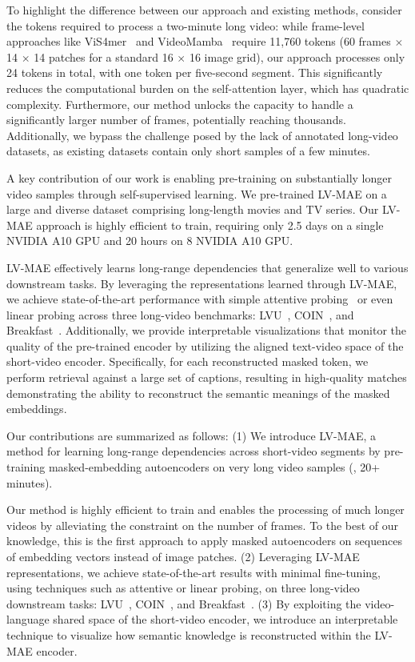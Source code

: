 To highlight the difference between our approach and existing methods, consider the tokens required to process a two-minute long video: while frame-level approaches like ViS4mer~\cite{islam2022long} and VideoMamba~\cite{li2024videomamba} require 11,760 tokens (60 frames $\times$ 14 $\times$ 14 patches for a standard 16 $\times$ 16 image grid), our approach processes only 24 tokens in total, with one token per five-second segment.
This significantly reduces the computational burden on the self-attention layer, which has quadratic complexity. 
Furthermore, our method unlocks the capacity to handle a significantly larger number of frames, potentially reaching thousands. Additionally, we bypass the challenge posed by the lack of annotated long-video datasets, as existing datasets contain only short samples of a few minutes. 

A key contribution of our work is enabling pre-training on substantially longer video samples through self-supervised learning. We pre-trained LV-MAE on a large and diverse dataset comprising long-length movies and TV series. Our LV-MAE approach is highly efficient to train, requiring only 2.5 days on a single NVIDIA A10 GPU and 20 hours on 8 NVIDIA A10 GPU.


LV-MAE effectively learns long-range dependencies that generalize well to various downstream tasks. By leveraging the representations learned through LV-MAE, we achieve state-of-the-art performance with simple attentive probing~\cite{yu2022coca} or even linear probing across three long-video benchmarks: LVU~\cite{wu2021towards}, COIN~\cite{tang2019coin}, and Breakfast~\cite{kuehne2014language}. Additionally, we provide interpretable visualizations that monitor the quality of the pre-trained encoder by utilizing the aligned text-video space of the short-video encoder. Specifically, for each reconstructed masked token, we perform retrieval against a large set of captions, resulting in high-quality matches demonstrating the ability to reconstruct the semantic meanings of the masked embeddings. 

Our contributions are summarized as follows: (1) We introduce LV-MAE, a method for learning long-range dependencies across short-video segments by pre-training masked-embedding autoencoders on very long video samples (\eg, 20+ minutes). 

Our method is highly efficient to train and enables the processing of much longer videos by alleviating the constraint on the number of frames.
To the best of our knowledge, this is the first approach to apply masked autoencoders on sequences of embedding vectors instead of image patches.
(2) Leveraging LV-MAE representations, we achieve state-of-the-art results with minimal fine-tuning, using techniques such as attentive or linear probing, on three long-video downstream tasks: LVU~\cite{wu2021towards}, COIN~\cite{tang2019coin}, and Breakfast~\cite{kuehne2014language}. (3) By exploiting the video-language shared space of the short-video encoder, we introduce an interpretable technique to visualize how semantic knowledge is reconstructed within the LV-MAE encoder.